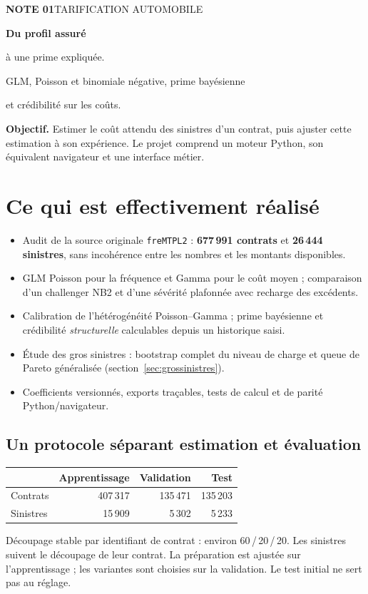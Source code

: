 \documentclass[11pt,a4paper]{article}
\begin{document}
{\small\color{Muted}\textbf{NOTE 01}\quad TARIFICATION AUTOMOBILE}
\vspace{5mm}

{\fontsize{27}{31}\selectfont\bfseries\color{Forest}Du profil assuré\par à une prime expliquée.}

{\large GLM, Poisson et binomiale négative, prime bayésienne\par et crédibilité sur les coûts.}
\vspace{3mm}

\begin{keybox}
\textbf{Objectif.} Estimer le coût attendu des sinistres d'un contrat, puis ajuster cette estimation à son expérience. Le projet comprend un moteur Python, son équivalent navigateur et une interface métier.
\end{keybox}

\section*{Ce qui est effectivement réalisé}
\begin{itemize}
\item Audit de la source originale \texttt{freMTPL2} : \textbf{677\,991 contrats} et \textbf{26\,444 sinistres}, sans incohérence entre les nombres et les montants disponibles.
\item GLM Poisson pour la fréquence et Gamma pour le coût moyen ; comparaison d'un challenger NB2 et d'une sévérité plafonnée avec recharge des excédents.
\item Calibration de l'hétérogénéité Poisson--Gamma ; prime bayésienne et crédibilité \emph{structurelle} calculables depuis un historique saisi.
\item Étude des gros sinistres : bootstrap complet du niveau de charge et queue de Pareto généralisée (section~\ref{sec:grossinistres}).
\item Coefficients versionnés, exports traçables, tests de calcul et de parité Python/navigateur.
\end{itemize}

\subsection*{Un protocole séparant estimation et évaluation}
\begin{center}
\begin{tabular}{lrrr}
\toprule
& Apprentissage & Validation & Test \\
\midrule
Contrats & 407\,317 & 135\,471 & 135\,203 \\
Sinistres & 15\,909 & 5\,302 & 5\,233 \\
\bottomrule
\end{tabular}
\end{center}
Découpage stable par identifiant de contrat : environ 60\,/\,20\,/\,20. Les sinistres suivent le découpage de leur contrat. La préparation est ajustée sur l'apprentissage ; les variantes sont choisies sur la validation. Le test initial ne sert pas au réglage.
\end{document}

